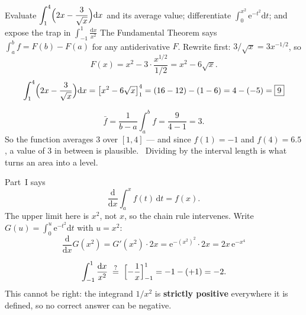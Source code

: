 \begin{worked}{Evaluate $\displaystyle\int_{1}^{4}\Bigl(2x-\frac{3}{\sqrt x}\Bigr)\mathrm{d}x$ and its average value; differentiate $\displaystyle\int_{0}^{x^{2}}\mathrm{e}^{-t^{2}}\mathrm{d}t$; and expose the trap in $\displaystyle\int_{-1}^{1}\frac{\mathrm{d}x}{x^{2}}$}
The Fundamental Theorem says $\int_{a}^{b}f=F(b)-F(a)$ for any
antiderivative $F$. Rewrite first: $3/\sqrt x=3x^{-1/2}$, so
\[
  F(x)=x^{2}-3\cdot\frac{x^{1/2}}{1/2}=x^{2}-6\sqrt x .
\]
\[
  \int_{1}^{4}\Bigl(2x-\frac{3}{\sqrt x}\Bigr)\mathrm{d}x
  =\bigl[x^{2}-6\sqrt x\bigr]_{1}^{4}
  =(16-12)-(1-6)=4-(-5)=\boxed{9}
\]

\[
  \bar f=\frac{1}{b-a}\int_{a}^{b}f
  =\frac{9}{4-1}=3 .
\]
So the function averages $3$ over $[1,4]$ --- and since $f(1)=-1$ and
$f(4)=6.5$, a value of $3$ in between is plausible. \checkmark\ Dividing by
the interval length is what turns an area into a level.

Part~I says
\[
  \frac{\mathrm{d}}{\mathrm{d}x}\int_{a}^{x}f(t)\,\mathrm{d}t=f(x) .
\]
The upper limit here is $x^{2}$, not $x$, so the chain rule intervenes.
Write $G(u)=\int_{0}^{u}\mathrm{e}^{-t^{2}}\mathrm{d}t$ with $u=x^{2}$:
\[
  \frac{\mathrm{d}}{\mathrm{d}x}G(x^{2})=G'(x^{2})\cdot2x
  =\mathrm{e}^{-(x^{2})^{2}}\cdot2x
  =\boxed{2x\,\mathrm{e}^{-x^{4}}}
\]

\[
  \int_{-1}^{1}\frac{\mathrm{d}x}{x^{2}}
  \;\overset{?}{=}\;\Bigl[-\frac1x\Bigr]_{-1}^{1}
  =-1-(+1)=-2 .
\]
This cannot be right: the integrand $1/x^{2}$ is \textbf{strictly positive}
everywhere it is defined, so no correct answer can be negative.


\end{worked}
